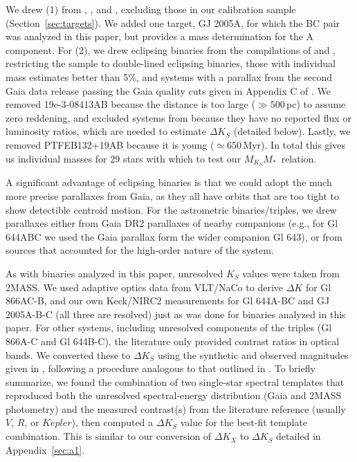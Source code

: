 \documentclass[twocolumn]{aastex62}
\newcommand{\mmk}{$M_{K_S}$\textendash$M_*$}
\begin{document}
We drew (1) from \citet{Hen1993}, \citet{Delfosse2000}, and \citet{Benedict2016}, excluding those in our calibration sample (Section~\ref{sec:targets}). We added one target, GJ 2005A, for which the BC pair was analyzed in this paper, but \citet{Sef2008} provides a mass determination for the A component. For (2), we drew eclipsing binaries from the compilations of \citet{Hartman2011} and \citet{Parsons2018}, restricting the sample to double-lined eclipsing binaries, those with individual mass estimates better than 5\%, and systems with a parallax from the second Gaia data release passing the Gaia quality cuts given in Appendix C of \citet{GaiaDr2}. We removed 19e-3-08413AB because the distance is too large ($\gg500$\,pc) to assume zero reddening, and excluded systems from \citet{Kraus2011} because they have no reported flux or luminosity ratios, which are needed to estimate $\Delta K_S$ (detailed below). Lastly, we removed PTFEB132+19AB \citep{2017ApJ...845...72K} because it is young ($\simeq$650\,Myr). In total this gives us individual masses for 29 stars with which to test our \mmk\ relation. 

A significant advantage of eclipsing binaries is that we could adopt the much more precise parallaxes from Gaia, as they all have orbits that are too tight to show detectible centroid motion. For the astrometric binaries/triples, we drew parallaxes either from Gaia DR2 parallaxes of nearby companions (e.g., for Gl 644ABC we used the Gaia parallax form the wider companion Gl 643), or from sources that accounted for the high-order nature of the system. 

As with binaries analyzed in this paper, unresolved $K_S$ values were taken from 2MASS. We used adaptive optics data from VLT/NaCo to derive $\Delta K$ for Gl 866AC-B, and our own Keck/NIRC2 measurements for Gl 644A-BC and GJ 2005A-B-C (all three are resolved) just as was done for binaries analyzed in this paper. For other systems, including unresolved components of the triples (Gl 866A-C and Gl 644B-C), the literature only provided contrast ratios in optical bands. We converted these to $\Delta K_S$ using the synthetic and observed magnitudes given in \citet{Mann2015b}, following a procedure analogous to that outlined in \citep{2017ApJ...845...72K}. To briefly summarize, we found the combination of two single-star spectral templates that reproduced both the unresolved spectral-energy distribution (Gaia and 2MASS photometry) and the measured contrast(s) from the literature reference (usually $V$, $R$, or $Kepler$), then computed a $\Delta K_S$ value for the best-fit template combination. This is similar to our conversion of $\Delta K_X$ to $\Delta K_S$ detailed in Appendix~\ref{sec:a1}. 
\end{document}

